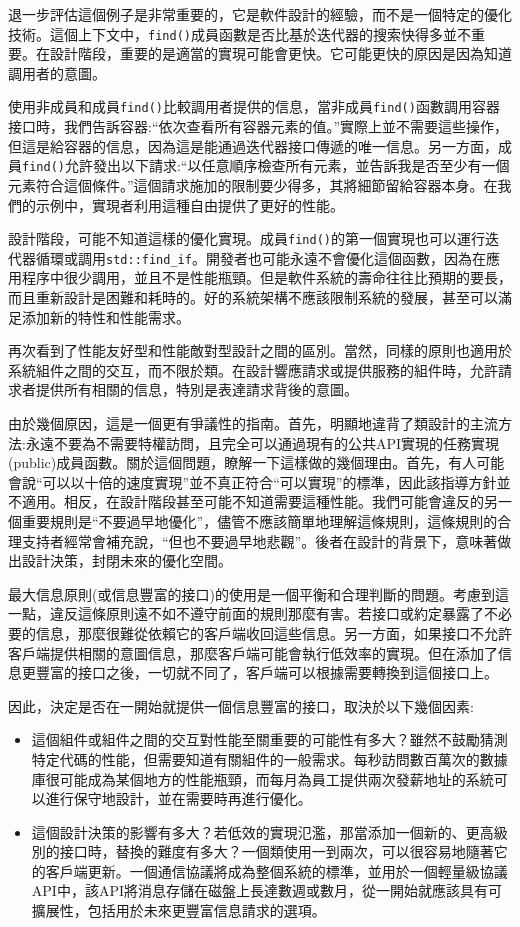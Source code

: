 退一步評估這個例子是非常重要的，它是軟件設計的經驗，而不是一個特定的優化技術。這個上下文中，\texttt{find()}成員函數是否比基於迭代器的搜索快得多並不重要。在設計階段，重要的是適當的實現可能會更快。它可能更快的原因是因為知道調用者的意圖。 

使用非成員和成員\texttt{find()}比較調用者提供的信息，當非成員\texttt{find()}函數調用容器接口時，我們告訴容器:“依次查看所有容器元素的值。”實際上並不需要這些操作，但這是給容器的信息，因為這是能通過迭代器接口傳遞的唯一信息。另一方面，成員\texttt{find()}允許發出以下請求:“以任意順序檢查所有元素，並告訴我是否至少有一個元素符合這個條件。”這個請求施加的限制要少得多，其將細節留給容器本身。在我們的示例中，實現者利用這種自由提供了更好的性能。

設計階段，可能不知道這樣的優化實現。成員\texttt{find()}的第一個實現也可以運行迭代器循環或調用\texttt{std::find\_if}。開發者也可能永遠不會優化這個函數，因為在應用程序中很少調用，並且不是性能瓶頸。但是軟件系統的壽命往往比預期的要長，而且重新設計是困難和耗時的。好的系統架構不應該限制系統的發展，甚至可以滿足添加新的特性和性能需求。

再次看到了性能友好型和性能敵對型設計之間的區別。當然，同樣的原則也適用於系統組件之間的交互，而不限於類。在設計響應請求或提供服務的組件時，允許請求者提供所有相關的信息，特別是表達請求背後的意圖。

由於幾個原因，這是一個更有爭議性的指南。首先，明顯地違背了類設計的主流方法:永遠不要為不需要特權訪問，且完全可以通過現有的公共API實現的任務實現(public)成員函數。關於這個問題，瞭解一下這樣做的幾個理由。首先，有人可能會說“可以以十倍的速度實現”並不真正符合“可以實現”的標準，因此該指導方針並不適用。相反，在設計階段甚至可能不知道需要這種性能。我們可能會違反的另一個重要規則是“不要過早地優化”，儘管不應該簡單地理解這條規則，這條規則的合理支持者經常會補充說，“但也不要過早地悲觀”。後者在設計的背景下，意味著做出設計決策，封閉未來的優化空間。

最大信息原則(或信息豐富的接口)的使用是一個平衡和合理判斷的問題。考慮到這一點，違反這條原則遠不如不遵守前面的規則那麼有害。若接口或約定暴露了不必要的信息，那麼很難從依賴它的客戶端收回這些信息。另一方面，如果接口不允許客戶端提供相關的意圖信息，那麼客戶端可能會執行低效率的實現。但在添加了信息更豐富的接口之後，一切就不同了，客戶端可以根據需要轉換到這個接口上。

因此，決定是否在一開始就提供一個信息豐富的接口，取決於以下幾個因素: 

\begin{itemize}
\item 
這個組件或組件之間的交互對性能至關重要的可能性有多大？雖然不鼓勵猜測特定代碼的性能，但需要知道有關組件的一般需求。每秒訪問數百萬次的數據庫很可能成為某個地方的性能瓶頸，而每月為員工提供兩次發薪地址的系統可以進行保守地設計，並在需要時再進行優化。

\item 
這個設計決策的影響有多大？若低效的實現氾濫，那當添加一個新的、更高級別的接口時，替換的難度有多大？一個類使用一到兩次，可以很容易地隨著它的客戶端更新。一個通信協議將成為整個系統的標準，並用於一個輕量級協議API中，該API將消息存儲在磁盤上長達數週或數月，從一開始就應該具有可擴展性，包括用於未來更豐富信息請求的選項。
\end{itemize}

